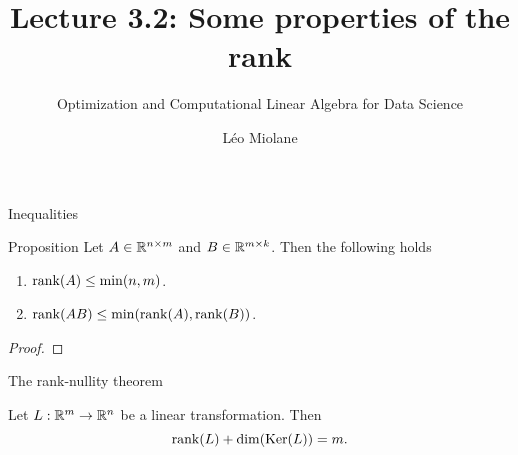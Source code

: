 \documentclass{beamer}
\title{Lecture 3.2: Some properties of the rank}
\subtitle{Optimization and Computational Linear Algebra for Data Science}
\author{Léo Miolane}
\date{}
\begin{document}
\setcounter{showProgressBar}{0}
\setcounter{showSlideNumbers}{0}

\frame{\titlepage}



\setcounter{framenumber}{0}
\setcounter{showSlideNumbers}{1}

\begin{frame}[t]{Inequalities}
	\vspace{-0.3cm}
	\begin{block}{Proposition}
		Let $A \in \mathbb{R}^{n \times m}$ and $B \in \mathbb{R}^{m \times k}$. Then the following holds
		\begin{enumerate}
			\item ${{\rm rank}}(A) \leq \min(n,m)$.
			\item ${{\rm rank}}(AB) \leq \min({{\rm rank}}(A),{{\rm rank}}(B))$.
		\end{enumerate}
	\end{block}
	\begin{proof}
		\vfill
		\vspace{3.5cm}
	\end{proof}
	\pause
\end{frame}

\begin{frame}[t]{The rank-nullity theorem}
	\begin{theorem}
		Let $L: \mathbb{R}^m \to \mathbb{R}^n$ be a linear transformation. Then
		$$
		{{\rm rank}}(L) + {{\rm dim}}({{\rm Ker}}(L)) = m.
		$$
	\end{theorem}
\end{frame}
\end{document}
